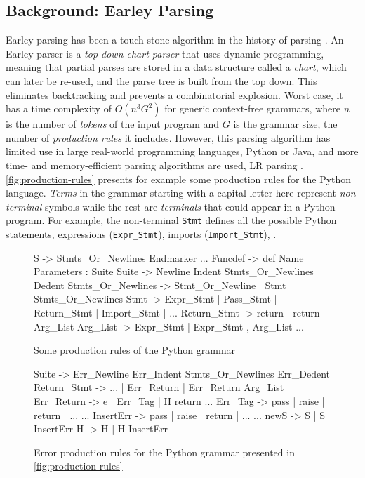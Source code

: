 \subsection{Background: Earley Parsing}
\label{sec:overview:earleyparsing}

 Earley parsing has been a touch-stone algorithm in the
history of parsing \citep{Earley_1970}. An Earley parser is a \emph{top-down
chart parser} that uses dynamic programming, meaning that partial parses are
stored in a data structure called a \emph{chart}, which can later be re-used,
and the parse tree is built from the top down. This eliminates backtracking and
prevents a combinatorial explosion. Worst case, it has a time complexity of
$O(n^3 G^2)$ for generic context-free grammars, where $n$ is the number of
\emph{tokens} of the input program and $G$ is the grammar size, \ie the number
of \emph{production rules} it includes. However, this parsing algorithm has
limited use in large real-world programming languages, \eg Python or Java, and
more time- and memory-efficient parsing algorithms are used, \eg LR parsing \etc
\citep{Knuth_1965, Chapman_1987}. \autoref{fig:production-rules} presents for
example some production rules for the Python language. \emph{Terms} in the
grammar starting with a capital letter here represent \emph{non-terminal}
symbols while the rest are \emph{terminals} that could appear in a Python
program. For example, the non-terminal \texttt{Stmt} defines all the possible
Python statements, \ie expressions (\texttt{Expr\_Stmt}), imports
(\texttt{Import\_Stmt}), \etc.

\begin{figure}[t]
\begin{ecode}
S -> Stmts_Or_Newlines Endmarker
...
Funcdef -> def Name Parameters : Suite
Suite -> Newline Indent Stmts_Or_Newlines Dedent
Stmts_Or_Newlines -> Stmt_Or_Newline | Stmt Stmts_Or_Newlines
Stmt -> Expr_Stmt | Pass_Stmt | Return_Stmt | Import_Stmt | ...
Return_Stmt -> return | return Arg_List
Arg_List -> Expr_Stmt | Expr_Stmt , Arg_List
...
\end{ecode}
\caption{Some production rules of the Python grammar}
\label{fig:production-rules}
\end{figure}

\begin{figure}[h]
\begin{ecode}
Suite -> Err_Newline Err_Indent Stmts_Or_Newlines Err_Dedent
Return_Stmt -> ... | Err_Return | Err_Return Arg_List
Err_Return -> e | Err_Tag | H return
...
Err_Tag -> pass | raise | return | ...
...
InsertErr -> pass | raise | return | ...
...
newS -> S | S InsertErr
H -> H | H InsertErr
\end{ecode}
\caption{Error production rules for the Python grammar presented in
\autoref{fig:production-rules}}
\label{fig:error-rules}
\end{figure}

